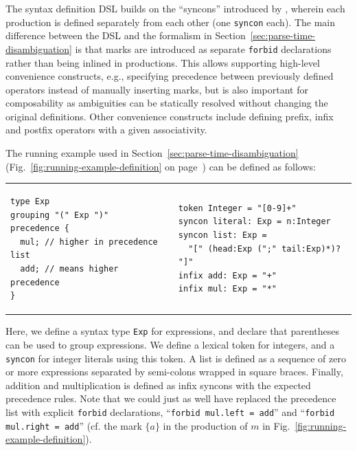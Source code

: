 \documentclass[acmsmall,review,anonymous]{acmart}\settopmatter{printfolios=true,printccs=false,printacmref=false}
\newcommand{\syncon}{\lstinline[language=syncon]}
\begin{document}
The syntax definition DSL builds on the ``syncons'' introduced by
\citet{palmkvistCreatingDomainSpecificLanguages2019}, wherein each
production is defined separately from each other (one
\syncon{syncon} each).
%
The main difference between the DSL and the formalism in
Section~\ref{sec:parse-time-disambiguation} is that marks are
introduced as separate \syncon{forbid} declarations rather than
being inlined in productions. This allows supporting high-level
convenience constructs, e.g., specifying precedence between
previously defined operators instead of manually inserting marks,
but is also important for composability as ambiguities can be
statically resolved without changing the original definitions.
Other convenience constructs include defining prefix, infix and
postfix operators with a given associativity.

The running example used in
Section~\ref{sec:parse-time-disambiguation}
(Fig.~\ref{fig:running-example-definition} on
page~\pageref{fig:running-example-definition}) can be defined as
follows:

\begin{tabular}{ll}
\small
\begin{lstlisting}[language=syncon,boxpos=t]
type Exp
grouping "(" Exp ")"
precedence {
  mul; // higher in precedence list
  add; // means higher precedence
}
\end{lstlisting}
&
\small
\begin{lstlisting}[language=syncon,boxpos=t]
token Integer = "[0-9]+"
syncon literal: Exp = n:Integer
syncon list: Exp =
  "[" (head:Exp (";" tail:Exp)*)? "]"
infix add: Exp = "+"
infix mul: Exp = "*"
\end{lstlisting}
\end{tabular}\smallskip

\noindent Here, we define a syntax type \syncon{Exp} for
expressions, and declare that parentheses can be used to group
expressions. We define a lexical token for integers, and a
\syncon{syncon} for integer literals using this token. A list is
defined as a sequence of zero or more expressions separated by
semi-colons wrapped in square braces. Finally, addition and
multiplication is defined as infix syncons with the expected
precedence rules. Note that we could just as well have replaced
the precedence list with explicit \syncon{forbid} declarations,
``\syncon{forbid mul.left = add}'' and ``\syncon{forbid mul.right = add}''
(cf. the mark $\{a\}$ in the production of $m$ in
Fig.~\ref{fig:running-example-definition}).

\end{document}
